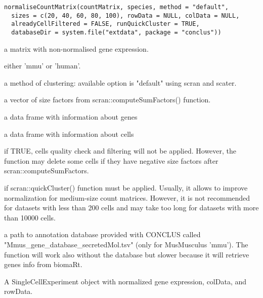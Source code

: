 \documentclass[a4paper]{book}
\begin{document}
%
\begin{Usage}
\begin{verbatim}
normaliseCountMatrix(countMatrix, species, method = "default",
  sizes = c(20, 40, 60, 80, 100), rowData = NULL, colData = NULL,
  alreadyCellFiltered = FALSE, runQuickCluster = TRUE,
  databaseDir = system.file("extdata", package = "conclus"))
\end{verbatim}
\end{Usage}
%
\begin{Arguments}
\begin{ldescription}
\item[\code{countMatrix}] a matrix with non-normalised gene expression.

\item[\code{species}] either 'mmu' or 'human'.

\item[\code{method}] a method of clustering: available option is "default" using scran and scater.

\item[\code{sizes}] a vector of size factors from scran::computeSumFactors() function.

\item[\code{rowData}] a data frame with information about genes

\item[\code{colData}] a data frame with information about cells

\item[\code{alreadyCellFiltered}] if TRUE, cells quality check and filtering will not be applied. 
However, the function may delete some cells if they have negative size factors after scran::computeSumFactors.

\item[\code{runQuickCluster}] if scran::quickCluster() function must be applied.
Usually, it allows to improve normalization for medium-size count matrices. 
However, it is not recommended for datasets with less than 200 cells and
may take too long for datasets with more than 10000 cells.

\item[\code{databaseDir}] a path to annotation database provided with CONCLUS called 
"Mmus\_gene\_database\_secretedMol.tsv" (only for MusMusculus 'mmu').
The function will work also without the database but slower because it will retrieve genes info from biomaRt.
\end{ldescription}
\end{Arguments}
%
\begin{Value}
A SingleCellExperiment object with normalized gene expression, colData, and rowData.
\end{Value}
\end{document}
